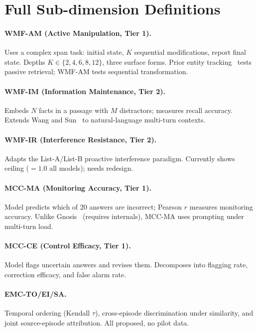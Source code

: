 \documentclass{article}
\begin{document}
\section{Full Sub-dimension Definitions}
\label{app:subdims}

\paragraph{WMF-AM (Active Manipulation, Tier 1).}
Uses a complex span task: initial state, $K$ sequential modifications,
report final state. Depths $K \in \{2,4,6,8,12\}$, three surface forms.
Prior entity tracking~\citep{entitytracking2023} tests passive retrieval;
WMF-AM tests sequential transformation.

\paragraph{WMF-IM (Information Maintenance, Tier 2).}
Embeds $N$ facts in a passage with $M$ distractors; measures recall
accuracy. Extends Wang and Sun~\citep{wang2025unableforgetproactiveinterference}
to natural-language multi-turn contexts.

\paragraph{WMF-IR (Interference Resistance, Tier 2).}
Adapts the List-A/List-B proactive interference paradigm.
Currently shows ceiling ($= 1.0$ all models); needs redesign.

\paragraph{MCC-MA (Monitoring Accuracy, Tier 1).}
Model predicts which of 20 answers are incorrect; Pearson $r$ measures
monitoring accuracy. Unlike Gnosis~\citep{ghasemabadi2025can} (requires
internals), MCC-MA uses prompting under multi-turn load.

\paragraph{MCC-CE (Control Efficacy, Tier 1).}
Model flags uncertain answers and revises them. Decomposes into flagging
rate, correction efficacy, and false alarm rate.

\paragraph{EMC-TO/EI/SA.}
Temporal ordering (Kendall $\tau$), cross-episode discrimination under
similarity, and joint source-episode attribution. All proposed, no pilot data.
\end{document}
